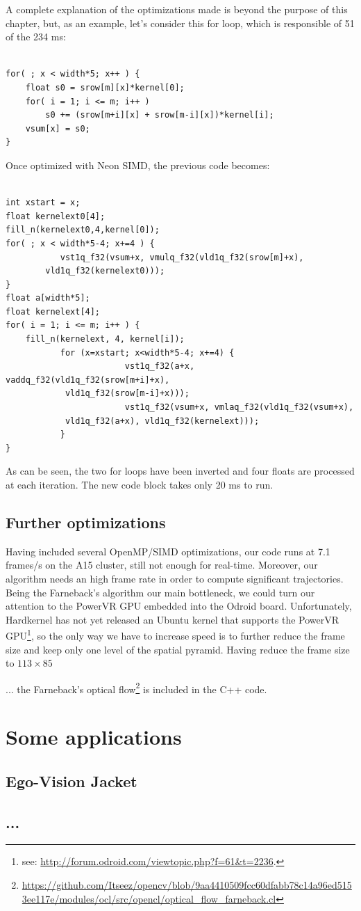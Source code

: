 A complete explanation of the optimizations made is beyond the purpose of this chapter, but, as an example, let's consider this for loop, which is responsible of 51 of the 234 ms:
\begin{lstlisting}[frame=single]  % Start your code-block

for( ; x < width*5; x++ ) {
	float s0 = srow[m][x]*kernel[0];
	for( i = 1; i <= m; i++ )
		s0 += (srow[m+i][x] + srow[m-i][x])*kernel[i];
	vsum[x] = s0;
}
\end{lstlisting}

Once optimized with Neon SIMD, the previous code becomes:
\begin{lstlisting}[frame=single]  % Start your code-block

int xstart = x;
float kernelext0[4];
fill_n(kernelext0,4,kernel[0]);
for( ; x < width*5-4; x+=4 ) {
           vst1q_f32(vsum+x, vmulq_f32(vld1q_f32(srow[m]+x),
		vld1q_f32(kernelext0)));
}
float a[width*5];
float kernelext[4];
for( i = 1; i <= m; i++ ) {
	fill_n(kernelext, 4, kernel[i]);
           for (x=xstart; x<width*5-4; x+=4) {
                        vst1q_f32(a+x, vaddq_f32(vld1q_f32(srow[m+i]+x), 
			vld1q_f32(srow[m-i]+x)));
                        vst1q_f32(vsum+x, vmlaq_f32(vld1q_f32(vsum+x), 
			vld1q_f32(a+x), vld1q_f32(kernelext)));
           }
}
\end{lstlisting}
As can be seen, the two for loops have been inverted and four floats are processed at each iteration. The new code block takes only 20 ms to run. 

\subsection{Further optimizations}
Having included several OpenMP/SIMD optimizations, our code runs at 7.1 frames/s on the A15 cluster, still not enough for real-time. Moreover, our algorithm needs an high frame rate in order to compute significant trajectories. Being the Farneback's algorithm our main bottleneck, we could turn our attention to the PowerVR GPU embedded into the Odroid board. Unfortunately, Hardkernel has not yet released an Ubuntu kernel that supports the PowerVR GPU\footnote{see: \url{http://forum.odroid.com/viewtopic.php?f=61&t=2236}.}, so the only way we have to increase speed is to further reduce the frame size and keep only one level of the spatial pyramid. Having reduce the frame size to $113\times 85$


... the Farneback's optical flow\footnote{\url{https://github.com/Itseez/opencv/blob/9aa4410509fcc60dfabb78c14a96ed5153ee117e/modules/ocl/src/opencl/optical_flow_farneback.cl}} is included in the C++ code.


\section{Some applications}
\subsection{Ego-Vision Jacket}
\subsection{...}
